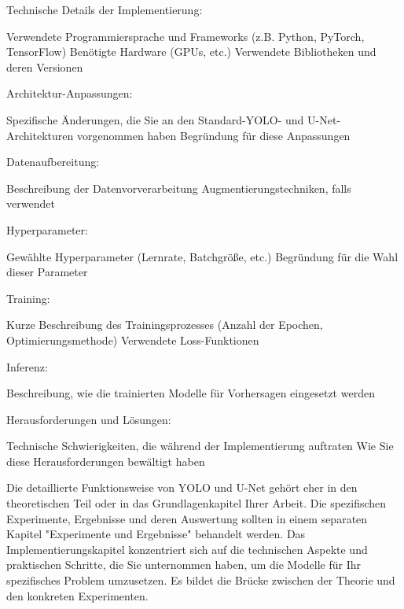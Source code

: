 Technische Details der Implementierung:

Verwendete Programmiersprache und Frameworks (z.B. Python, PyTorch, TensorFlow)
Benötigte Hardware (GPUs, etc.)
Verwendete Bibliotheken und deren Versionen


Architektur-Anpassungen:

Spezifische Änderungen, die Sie an den Standard-YOLO- und U-Net-Architekturen vorgenommen haben
Begründung für diese Anpassungen


Datenaufbereitung:

Beschreibung der Datenvorverarbeitung
Augmentierungstechniken, falls verwendet


Hyperparameter:

Gewählte Hyperparameter (Lernrate, Batchgröße, etc.)
Begründung für die Wahl dieser Parameter


Training:

Kurze Beschreibung des Trainingsprozesses (Anzahl der Epochen, Optimierungsmethode)
Verwendete Loss-Funktionen


Inferenz:

Beschreibung, wie die trainierten Modelle für Vorhersagen eingesetzt werden


Herausforderungen und Lösungen:

Technische Schwierigkeiten, die während der Implementierung auftraten
Wie Sie diese Herausforderungen bewältigt haben



Die detaillierte Funktionsweise von YOLO und U-Net gehört eher in den theoretischen Teil oder in das Grundlagenkapitel Ihrer Arbeit. Die spezifischen Experimente, Ergebnisse und deren Auswertung sollten in einem separaten Kapitel "Experimente und Ergebnisse" behandelt werden.
Das Implementierungskapitel konzentriert sich auf die technischen Aspekte und praktischen Schritte, die Sie unternommen haben, um die Modelle für Ihr spezifisches Problem umzusetzen. Es bildet die Brücke zwischen der Theorie und den konkreten Experimenten.